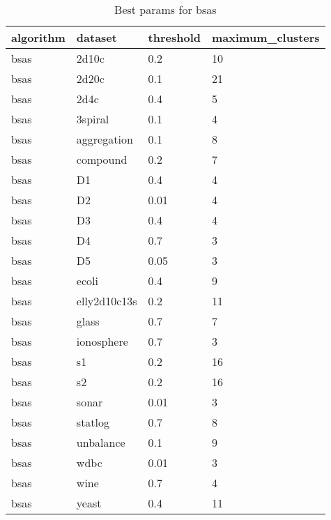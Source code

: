 \begin{table}[H]
\centering
\caption{Best params for bsas}
\label{S9_Table}
\begin{tabular}{|l|l|l|l|}
\hline
algorithm & dataset & threshold & maximum\_clusters \\
\hline
bsas & 2d10c & 0.2 & 10 \\
\hline
bsas & 2d20c & 0.1 & 21 \\
\hline
bsas & 2d4c & 0.4 & 5 \\
\hline
bsas & 3spiral & 0.1 & 4 \\
\hline
bsas & aggregation & 0.1 & 8 \\
\hline
bsas & compound & 0.2 & 7 \\
\hline
bsas & D1 & 0.4 & 4 \\
\hline
bsas & D2 & 0.01 & 4 \\
\hline
bsas & D3 & 0.4 & 4 \\
\hline
bsas & D4 & 0.7 & 3 \\
\hline
bsas & D5 & 0.05 & 3 \\
\hline
bsas & ecoli & 0.4 & 9 \\
\hline
bsas & elly2d10c13s & 0.2 & 11 \\
\hline
bsas & glass & 0.7 & 7 \\
\hline
bsas & ionosphere & 0.7 & 3 \\
\hline
bsas & s1 & 0.2 & 16 \\
\hline
bsas & s2 & 0.2 & 16 \\
\hline
bsas & sonar & 0.01 & 3 \\
\hline
bsas & statlog & 0.7 & 8 \\
\hline
bsas & unbalance & 0.1 & 9 \\
\hline
bsas & wdbc & 0.01 & 3 \\
\hline
bsas & wine & 0.7 & 4 \\
\hline
bsas & yeast & 0.4 & 11 \\
\hline
\end{tabular}
\end{table}

\clearpage


